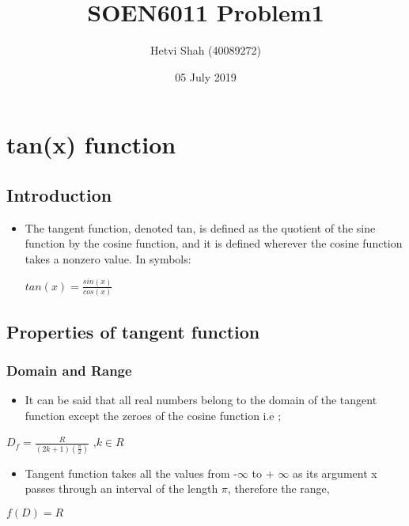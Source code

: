 \documentclass{article}
\title{SOEN6011 Problem1}
\author{Hetvi Shah (40089272)}
\date{05 July 2019}
\begin{document}
\noindent
\maketitle
\section{tan(x) function}
\subsection{Introduction}
\begin{itemize}
    \item The tangent function, denoted tan, is defined as the quotient of the sine function by the cosine function, and it is defined wherever the cosine function takes a nonzero value. In symbols:
\begin{center}
    $tan(x)=\frac{sin(x)}{cos(x)}$
\end{center}\hfill    
\end{itemize}
\subsection{Properties of tangent function}
\subsubsection{Domain and Range}
\begin{itemize}
    \item It can be said that all real numbers belong to the domain of the tangent function except the zeroes of the cosine function i.e ;
\end{itemize}
        
\begin{center}
$D_f=\frac{R}{(2k+1)(\frac{\pi}{2})}$ ,$ k \in R$
\end{center}\hfill
\begin{itemize}
    \item Tangent function takes all the values from -$\infty$ to + $\infty$ as its argument x passes through an interval of the length $\pi$, therefore the range,
\end{itemize}
\begin{center}
    $f(D)=R$ 
\end{center}\hfill
\end{document}

